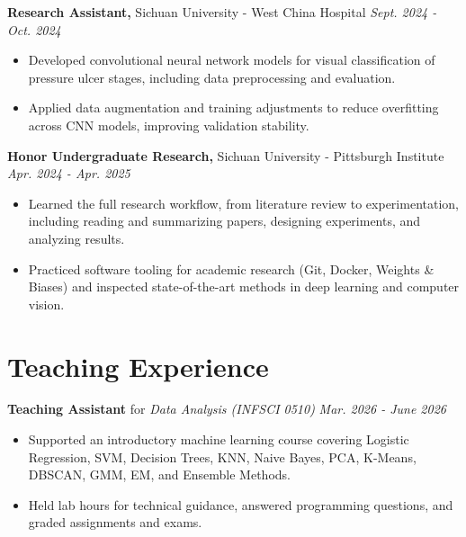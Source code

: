 \documentclass[10pt]{article}
\begin{document}
\vspace{0.055cm}

\textbf{Research Assistant,} Sichuan University - West China Hospital \hfill \textit{Sept. 2024 - Oct. 2024}

\begin{itemize}
    \item Developed convolutional neural network models for visual classification of pressure ulcer stages, including data preprocessing and evaluation.
    \item Applied data augmentation and training adjustments to reduce overfitting across CNN models, improving validation stability.
\end{itemize}

\vspace{0.055cm}

\textbf{Honor Undergraduate Research,} Sichuan University - Pittsburgh Institute \hfill \textit{Apr. 2024 - Apr. 2025}

\begin{itemize}
    \item Learned the full research workflow, from literature review to experimentation, including reading and summarizing papers, designing experiments, and analyzing results.
    \item Practiced software tooling for academic research (Git, Docker, Weights \& Biases) and inspected state-of-the-art methods in deep learning and computer vision.
\end{itemize}

\section{Teaching Experience}
\textbf{Teaching Assistant} for \textit{Data Analysis (INFSCI 0510)} \hfill \textit{Mar. 2026 - June 2026}

\begin{itemize}
    \item Supported an introductory machine learning course covering Logistic Regression, SVM, Decision Trees, KNN, Naive Bayes, PCA, K-Means, DBSCAN, GMM, EM, and Ensemble Methods.
    \item Held lab hours for technical guidance, answered programming questions, and graded assignments and exams.
\end{itemize}
\end{document}
